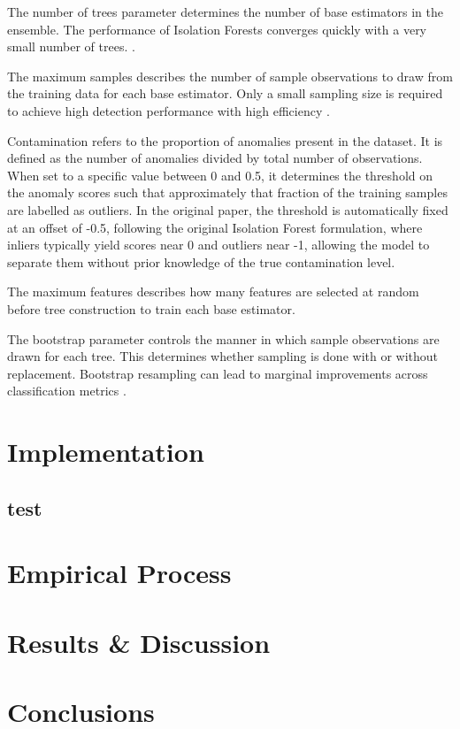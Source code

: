 \documentclass[10pt, conference]{IEEEtran}
\begin{document}
The number of trees parameter determines the number of base estimators in the ensemble. The performance of Isolation Forests converges quickly with a very small number of trees. \cite{iforest}. 

The maximum samples describes the number of sample observations to draw from the training data for each base estimator. Only a small sampling size is required to achieve high detection performance with high efficiency \cite{iforest}.

Contamination refers to the proportion of anomalies present in the dataset. It is defined as the number of anomalies divided by total number of observations. When set to a specific value between 0 and 0.5, it determines the threshold on the anomaly scores such that approximately that fraction of the training samples are labelled as outliers. In the original paper, the threshold is automatically fixed at an offset of -0.5, following the original Isolation Forest formulation, where inliers typically yield scores near 0 and outliers near -1, allowing the model to separate them without prior knowledge of the true contamination level.

The maximum features describes how many features are selected at random before tree construction to train each base estimator.

The bootstrap parameter controls the manner in which sample observations are drawn for each tree. This determines whether sampling is done with or without replacement. Bootstrap resampling can lead to marginal improvements across classification metrics \cite{Choi2025Impact}.



\section{Implementation}
\subsection{test}

\section{Empirical Process}



\section{Results \& Discussion}



\section{Conclusions}




\end{document}
